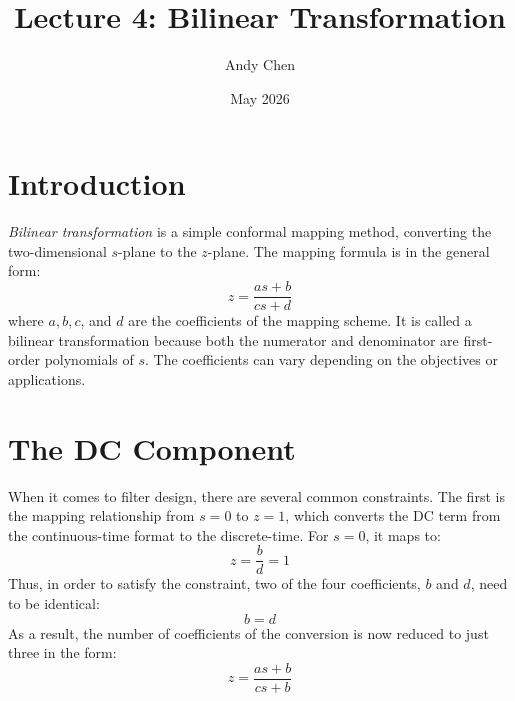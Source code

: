 \documentclass{article}
\title{Lecture 4: Bilinear Transformation}
\author{Andy Chen}
\date{May 2026}
\begin{document}
\maketitle

\section{Introduction}
\textit{Bilinear transformation} is a simple conformal mapping method, converting the two-dimensional \(s\)-plane to the \(z\)-plane. The mapping formula is in the general form:
\[
z=\frac{as+b}{cs+d}
\]
where \(a, b, c\), and \(d\) are the coefficients of the mapping scheme. It is called a bilinear transformation because both the numerator and denominator are first-order polynomials of \(s\). The coefficients can vary depending on the objectives or applications.

\section{The DC Component}
When it comes to filter design, there are several common constraints. The first is the mapping relationship from \(s=0\) to \(z=1\), which converts the DC term from the continuous-time format to the discrete-time. For \(s=0\), it maps to:
\[
z=\frac{b}{d}=1
\]
Thus, in order to satisfy the constraint, two of the four coefficients, \(b\) and \(d\), need to be identical:
\[
b=d
\]
As a result, the number of coefficients of the conversion is now reduced to just three in the form:
\[
z=\frac{as+b}{cs+b}
\]
\end{document}
